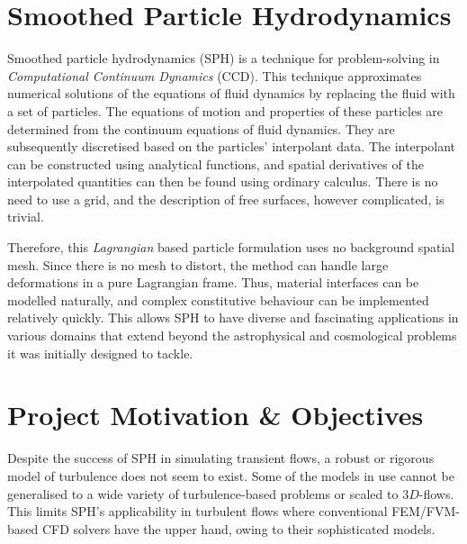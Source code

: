 \section{Smoothed Particle Hydrodynamics}
Smoothed particle hydrodynamics (SPH) is a technique for problem-solving in \textit{Computational Continuum Dynamics} (CCD). This technique approximates numerical solutions of the equations of fluid dynamics by replacing the fluid with a set of particles. The equations of motion and properties of these particles are determined from the continuum equations of fluid dynamics. They are subsequently discretised based on the particles' interpolant data. The interpolant can be constructed using analytical functions, and spatial derivatives of the interpolated quantities can then be found using ordinary calculus. There is no need to use a grid, and the description of free surfaces, however complicated, is trivial.

Therefore, this \textit{Lagrangian} based particle formulation uses no background spatial mesh. Since there is no mesh to distort, the method can handle large deformations in a pure Lagrangian frame. Thus, material interfaces can be modelled naturally, and complex constitutive behaviour can be implemented relatively quickly. This allows SPH to have diverse and fascinating applications in various domains that extend beyond the astrophysical and cosmological problems it was initially designed to tackle.

\section{Project Motivation \& Objectives}
Despite the success of SPH in simulating transient flows, a robust or rigorous model of turbulence does not seem to exist. Some of the models in use cannot be generalised to a wide variety of turbulence-based problems or scaled to $3D$-flows.
This limits SPH's applicability in turbulent flows where conventional FEM/FVM-based CFD solvers have the upper hand, owing to their sophisticated models.


